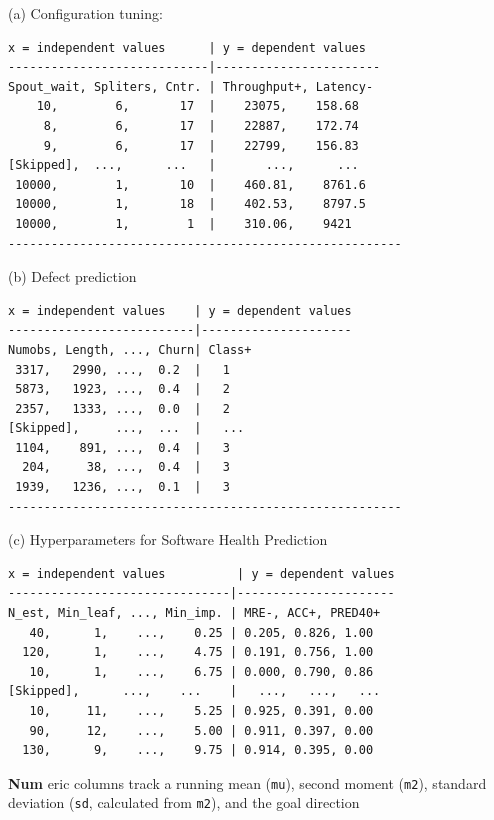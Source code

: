 \documentclass[AMA,STIX2COL]{WileyNJDv5}
\newcommand{\cls}[1]{%
  \setlength{\fboxsep}{1.5pt}%
  \colorbox{clsbg}{\sffamily\bfseries{#1}}%
}
\begin{document}
\begin{table}[!t]
\caption{Example MOOT datasets.}
\label{moot}
\begin{center}
\begin{minipage}{3in}
\normalsize{(a) Configuration tuning:}
{\fontsize{6pt}{7.2pt}\selectfont

\begin{verbatim}
x = independent values      | y = dependent values
----------------------------|-----------------------
Spout_wait, Spliters, Cntr. | Throughput+, Latency-
    10,        6,       17  |    23075,    158.68
     8,        6,       17  |    22887,    172.74
     9,        6,       17  |    22799,    156.83
[Skipped],  ...,      ...   |       ...,      ...
 10000,        1,       10  |    460.81,    8761.6
 10000,        1,       18  |    402.53,    8797.5
 10000,        1,        1  |    310.06,    9421
-------------------------------------------------------
\end{verbatim}}
\normalsize{(b) Defect prediction}
{\fontsize{6pt}{7.2pt}\selectfont
\begin{verbatim}
x = independent values    | y = dependent values
--------------------------|---------------------
Numobs, Length, ..., Churn| Class+
 3317,   2990, ...,  0.2  |   1
 5873,   1923, ...,  0.4  |   2
 2357,   1333, ...,  0.0  |   2
[Skipped],     ...,  ...  |   ...
 1104,    891, ...,  0.4  |   3
  204,     38, ...,  0.4  |   3
 1939,   1236, ...,  0.1  |   3
-------------------------------------------------------
\end{verbatim}}
\normalsize{(c) Hyperparameters for Software Health Prediction}
{\fontsize{6pt}{7.2pt}\selectfont
\begin{verbatim}
x = independent values          | y = dependent values
-------------------------------|----------------------
N_est, Min_leaf, ..., Min_imp. | MRE-, ACC+, PRED40+
   40,      1,    ...,    0.25 | 0.205, 0.826, 1.00
  120,      1,    ...,    4.75 | 0.191, 0.756, 1.00
   10,      1,    ...,    6.75 | 0.000, 0.790, 0.86
[Skipped],      ...,    ...    |   ...,   ...,   ...
   10,     11,    ...,    5.25 | 0.925, 0.391, 0.00
   90,     12,    ...,    5.00 | 0.911, 0.397, 0.00
  130,      9,    ...,    9.75 | 0.914, 0.395, 0.00
\end{verbatim}}
\end{minipage}
\end{center}
\end{table}
\cls{Num}eric columns   track   a running mean (\texttt{mu}), 
second moment (\texttt{m2}), standard deviation (\texttt{sd}, calculated from \texttt{m2}), and the goal direction 
\end{document}

